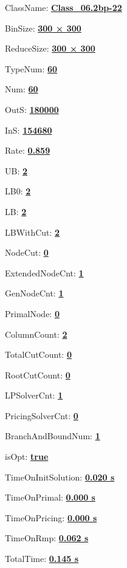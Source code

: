 \documentclass[11pt]{article}
\begin{document}
\pagestyle{empty}


ClassName: \underline{\textbf{Class_06.2bp-22}}
\par
BinSize: \underline{\textbf{300 × 300}}
\par
ReduceSize: \underline{\textbf{300 × 300}}
\par
TypeNum: \underline{\textbf{60}}
\par
Num: \underline{\textbf{60}}
\par
OutS: \underline{\textbf{180000}}
\par
InS: \underline{\textbf{154680}}
\par
Rate: \underline{\textbf{0.859}}
\par
UB: \underline{\textbf{2}}
\par
LB0: \underline{\textbf{2}}
\par
LB: \underline{\textbf{2}}
\par
LBWithCut: \underline{\textbf{2}}
\par
NodeCut: \underline{\textbf{0}}
\par
ExtendedNodeCnt: \underline{\textbf{1}}
\par
GenNodeCnt: \underline{\textbf{1}}
\par
PrimalNode: \underline{\textbf{0}}
\par
ColumnCount: \underline{\textbf{2}}
\par
TotalCutCount: \underline{\textbf{0}}
\par
RootCutCount: \underline{\textbf{0}}
\par
LPSolverCnt: \underline{\textbf{1}}
\par
PricingSolverCnt: \underline{\textbf{0}}
\par
BranchAndBoundNum: \underline{\textbf{1}}
\par
isOpt: \underline{\textbf{true}}
\par
TimeOnInitSolution: \underline{\textbf{0.020 s}}
\par
TimeOnPrimal: \underline{\textbf{0.000 s}}
\par
TimeOnPricing: \underline{\textbf{0.000 s}}
\par
TimeOnRmp: \underline{\textbf{0.062 s}}
\par
TotalTime: \underline{\textbf{0.145 s}}
\par
\newpage
\end{document}
